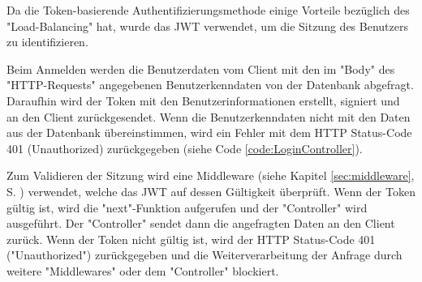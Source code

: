 
Da die Token-basierende Authentifizierungsmethode einige Vorteile bezüglich des "Load-Balancing" hat, wurde das JWT verwendet, um die Sitzung des Benutzers zu identifizieren.



Beim Anmelden werden die Benutzerdaten vom Client mit den im "Body" des "HTTP-Requests" angegebenen Benutzerkenndaten von der Datenbank abgefragt. 
Daraufhin wird der Token mit den Benutzerinformationen erstellt, signiert und an den Client zurückgesendet. 
Wenn die Benutzerkenndaten nicht mit den Daten aus der Datenbank übereinstimmen, wird ein Fehler mit dem HTTP Status-Code 401 (Unauthorized) zurückgegeben (siehe Code \ref{code:LoginController}).


\pagebreak
{}

Zum Validieren der Sitzung wird eine Middleware (siehe Kapitel \ref{sec:middleware}, S. \pageref{sec:middleware}) verwendet, welche das JWT auf dessen Gültigkeit überprüft. 
Wenn der Token gültig ist, wird die "next"-Funktion aufgerufen und der "Controller" wird ausgeführt. Der "Controller" sendet dann die angefragten Daten an den Client zurück. 
Wenn der Token nicht gültig ist, wird der HTTP Status-Code 401 ("Unauthorized") zurückgegeben und die Weiterverarbeitung der Anfrage durch weitere "Middlewares" oder dem "Controller" blockiert.

